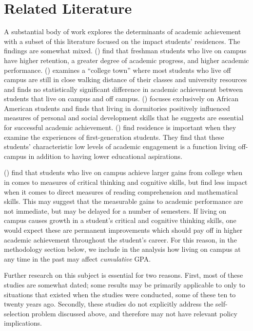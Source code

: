 \documentclass[12pt]{article}
\newcommand{\citee}[1]{\citename{#1} (\citeyear{#1})}
\begin{document}
\section{Related Literature}
A substantial body of work explores the determinants of academic achievement with a subset of this literature focused on the impact students' residences. The findings are somewhat mixed. \citee{tsr1993} find that freshman students who live on campus have higher retention, a greater degree of academic progress, and higher academic performance. \citee{delucchi1993} examines a ``college town'' where most students who live off campus are still in close walking distance of their classes and university resources and finds no statistically significant difference in academic achievement between students that live on campus and off campus.  \citee{flowers2004} focuses exclusively on African American students and finds that living in dormitories positively influenced measures of personal and social development skills that he suggests are essential for successful academic achievement. \citee{pikekuh2005} find residence is important when they examine the experiences of first-generation students. They find that these students' characteristic low levels of academic engagement is a function living off-campus in addition to having lower educational aspirations.

\citee{pascarella1993} find that students who live on campus achieve larger gains from college when in comes to measures of critical thinking and cognitive skills, but find less impact when it comes to direct measures of reading comprehension and mathematical skills.  This may suggest that the measurable gains to academic performance are not immediate, but may be delayed for a number of semesters.  If living on campus causes growth in a student's critical and cognitive thinking skills, one would expect these are permanent improvements which should pay off in higher academic achievement throughout the student's career.  For this reason, in the methodology section below, we include in the analysis how living on campus at any time in the past may affect \textit{cumulative} GPA.

Further research on this subject is essential for two reasons.  First, most of these studies are somewhat dated; some results may be primarily applicable to only to situations that existed when the studies were conducted, some of these ten to twenty years ago.  Secondly, these studies do not explicitly address the self-selection problem discussed above, and therefore may not have relevant policy implications.
\end{document}
